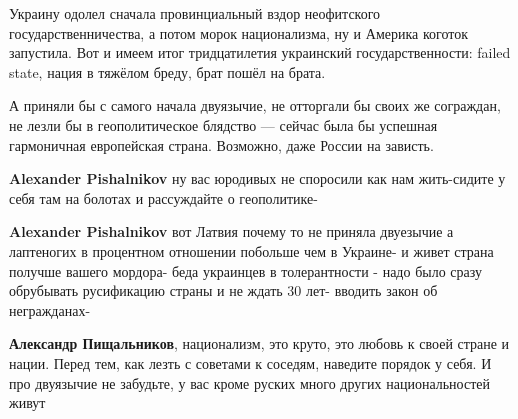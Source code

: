 \begin{itemize}
Украину одолел сначала провинциальный вздор неофитского государственничества, а
потом морок национализма, ну и Америка коготок запустила. Вот и имеем итог
тридцатилетия украинский государственности: failed state, нация в тяжёлом
бреду, брат пошёл на брата.

А приняли бы с самого начала двуязычие, не отторгали бы своих же сограждан, не
лезли бы в геополитическое блядство — сейчас была бы успешная гармоничная
европейская страна. Возможно, даже России на зависть.

\begin{itemize}
 
\textbf{Alexander Pishalnikov} ну вас юродивых не споросили как нам жить-сидите у себя там на болотах и рассуждайте о геополитике-

 
\textbf{Alexander Pishalnikov} вот Латвия почему то не приняла двуезычие а лаптеногих в процентном отношении побольше чем в Украине- и живет страна получше вашего мордора- беда украинцев в толерантности - надо было сразу обрубывать русификацию страны и не ждать 30 лет- вводить закон об негражданах-

 
\textbf{Александр Пищальников}, национализм, это круто, это любовь к своей стране и нации. Перед тем, как лезть с советами к соседям, наведите порядок у себя. И про двуязычие не забудьте, у вас кроме руских много других национальностей живут

 

\end{itemize}
\end{itemize}
